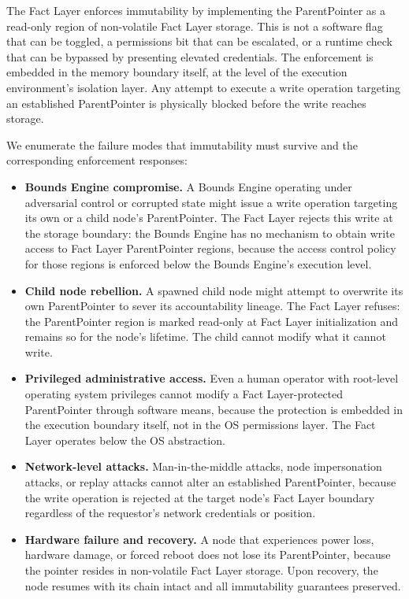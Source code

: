 The Fact Layer enforces immutability by implementing the ParentPointer as a read-only region of non-volatile Fact Layer storage. This is not a software flag that can be toggled, a permissions bit that can be escalated, or a runtime check that can be bypassed by presenting elevated credentials. The enforcement is embedded in the memory boundary itself, at the level of the execution environment's isolation layer. Any attempt to execute a write operation targeting an established ParentPointer is physically blocked before the write reaches storage.

We enumerate the failure modes that immutability must survive and the corresponding enforcement responses:

\begin{itemize}[noitemsep]
    \item \textbf{Bounds Engine compromise.} A Bounds Engine operating under adversarial control or corrupted state might issue a write operation targeting its own or a child node's ParentPointer. The Fact Layer rejects this write at the storage boundary: the Bounds Engine has no mechanism to obtain write access to Fact Layer ParentPointer regions, because the access control policy for those regions is enforced below the Bounds Engine's execution level.

    \item \textbf{Child node rebellion.} A spawned child node might attempt to overwrite its own ParentPointer to sever its accountability lineage. The Fact Layer refuses: the ParentPointer region is marked read-only at Fact Layer initialization and remains so for the node's lifetime. The child cannot modify what it cannot write.

    \item \textbf{Privileged administrative access.} Even a human operator with root-level operating system privileges cannot modify a Fact Layer-protected ParentPointer through software means, because the protection is embedded in the execution boundary itself, not in the OS permissions layer. The Fact Layer operates below the OS abstraction.

    \item \textbf{Network-level attacks.} Man-in-the-middle attacks, node impersonation attacks, or replay attacks cannot alter an established ParentPointer, because the write operation is rejected at the target node's Fact Layer boundary regardless of the requestor's network credentials or position.

    \item \textbf{Hardware failure and recovery.} A node that experiences power loss, hardware damage, or forced reboot does not lose its ParentPointer, because the pointer resides in non-volatile Fact Layer storage. Upon recovery, the node resumes with its chain intact and all immutability guarantees preserved.
\end{itemize}

